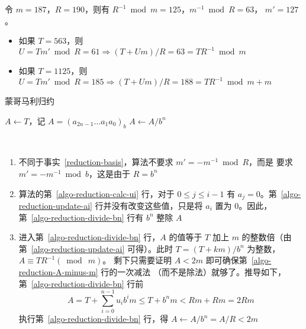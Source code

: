 \begin{example}[蒙哥马利归约]
  令 \(m=187\)，\(R=190\)，则有 \(R^{-1}\bmod m=125\)，\(m^{-1}\bmod R=63\)，
  \(m'=127\)。
  \begin{itemize}
    \item 如果 \(T=563\)，则\(U=Tm'\bmod R=61 \Rightarrow (T+Um)/R=63=TR^{-1}\bmod m\)
    \item 如果 \(T=1125\)，则\(U=Tm'\bmod R=185 \Rightarrow (T+Um)/R=188=TR^{-1}\bmod m + m\)
  \end{itemize}
\end{example}

\begin{algorithm}
  \caption{蒙哥马利归约}\label{algo-reduction}
  \DontPrintSemicolon
  \BlankLine
  \(A\leftarrow T\)，记 \(A=(a_{2n-1}\dots a_1a_0)_b\)\;
  \(A\leftarrow A/b^n\) \label{algo-reduction-divide-bn}\;
  \;
\end{algorithm}

\begin{note}\
  \begin{enumerate}
    \item 不同于事实~\ref{reduction-basis}，算法不要求 \(m'=-m^{-1}\bmod R\)，而是
    要求 \(m'=-m^{-1}\bmod b\)，这是由于 \(R=b^n\)
    \item 算法的第~\ref{algo-reduction-calc-ui} 行，对于 \(0\le j\le i-1\) 有 \(a_j=0\)。第~\ref{algo-reduction-update-ai} 行并没有改变这些值，只是将 \(a_i\) 置为 0。因此，
    第~\ref{algo-reduction-divide-bn} 行有 \(b^n\) 整除 \(A\)
    \item 进入第~\ref{algo-reduction-divide-bn} 行，\(A\) 的值等于 \(T\) 加上 \(m\) 的整数倍（由第~\ref{algo-reduction-update-ai} 可得）。此时 \(T=(T+km)/b^n\) 为整数，\(A\equiv TR^{-1}(\bmod\ m)\)。
     剩下只需要证明 \(A<2m\) 即可确保第~\ref{algo-reduction-A-minus-m} 行的一次减法
     （而不是除法）就够了。推导如下，第~\ref{algo-reduction-divide-bn} 行前
      \[
        A =T+\sum_{i=0}^{n-1}u_ib^im \le T+b^nm < Rm+Rm = 2Rm
      \]
     执行第~\ref{algo-reduction-divide-bn} 行，得 \(A\leftarrow A/b^n=A/R<2m\)
  \end{enumerate}
\end{note}


